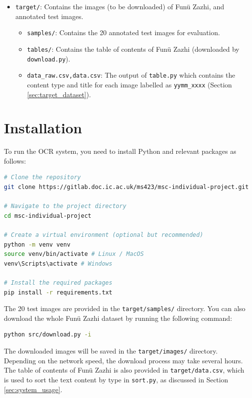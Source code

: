 \documentclass[12pt,twoside]{report}
\begin{document}
\begin{appendices}
{\begin{itemize}[leftmargin=*]
\begin{itemize}
        \item \texttt{easy\_ocr.py,paddle\_ocr.py,tesseract\_ocr.py}: Perform EasyOCR / PaddleOCR / Tesseract on the test images and save the output to \texttt{output/samples/}.
    \end{itemize}
    \item \texttt{target/}: Contains the images (to be downloaded) of Funü Zazhi, and annotated test images.
    \begin{itemize}
        \item \texttt{samples/}: Contains the 20 annotated test images for evaluation.
        \item \texttt{tables/}: Contains the table of contents of Funü Zazhi (downloaded by \texttt{download.py}).
        \item \texttt{data\_raw.csv,data.csv}: The output of \texttt{table.py} which contains the content type and title for each image labelled as \texttt{yymm\_xxxx} (Section \ref{sec:target_dataset}).
    \end{itemize}
\end{itemize}}

\section{Installation}
\label{sec:installation}
To run the OCR system, you need to install Python and relevant packages as follows:

\begin{lstlisting}[language=bash]
# Clone the repository
git clone https://gitlab.doc.ic.ac.uk/ms423/msc-individual-project.git

# Navigate to the project directory
cd msc-individual-project

# Create a virtual environment (optional but recommended)
python -m venv venv
source venv/bin/activate # Linux / MacOS
venv\Scripts\activate # Windows

# Install the required packages
pip install -r requirements.txt
\end{lstlisting}

The 20 test images are provided in the \texttt{target/samples/} directory. You can also download the whole Funü Zazhi dataset by running the following command:

\begin{lstlisting}[language=bash]
python src/download.py -i
\end{lstlisting}

The downloaded images will be saved in the \texttt{target/images/} directory. Depending on the network speed, the download process may take several hours. The table of contents of Funü Zazhi is also provided in \texttt{target/data.csv}, which is used to sort the text content by type in \texttt{sort.py}, as discussed in Section \ref{sec:system_usage}.


\end{appendices}
\end{document}
